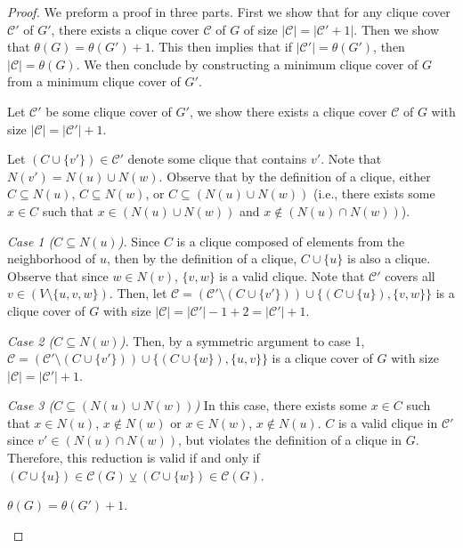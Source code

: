 \documentclass[../techreport.tex]{subfiles}
\begin{document}
\begin{proof}
	We preform a proof in three parts. First we show that for any clique cover $\mathcal{C'}$ of $G'$, there exists a clique cover $\mathcal{C}$ of $G$ of size $|\mathcal{C}| = |\mathcal{C'} + 1|$. Then we show that $\theta(G) = \theta(G') + 1$. This then implies that if $|\mathcal{C'}| = \theta(G')$, then $|\mathcal{C}| = \theta(G)$. We then conclude by constructing a minimum clique cover of $G$ from a minimum clique cover of $G'$.

	\begin{claim}
		Let $\mathcal{C'}$ be some clique cover of $G'$, we show there exists a clique cover $\mathcal{C}$ of $G$ with size $|\mathcal{C}| = |\mathcal{C'}| + 1$.
	\end{claim}

	Let $(C \cup \{v'\}) \in \mathcal{C'}$ denote some clique that contains $v'$. Note that $N(v') = N(u) \cup N(w)$. Observe that by the definition of a clique, either $C \subseteq N(u)$, $C \subseteq N(w)$, or $C \subseteq (N(u) \cup N(w))$ (i.e., there exists some $x \in C$ such that $x \in (N(u) \cup N(w))$ and $x \notin (N(u) \cap N(w))$).

	\noindent\emph{Case 1 ($C \subseteq N(u)$).} Since $C$ is a clique composed of elements from the neighborhood of $u$, then by the definition of a clique, $C \cup \{u\}$ is also a clique. Observe that since $w \in N(v)$, $\{v, w\}$ is a valid clique. Note that $\mathcal{C'}$ covers all $v \in (V \setminus \{u, v, w\})$. Then, let $\mathcal{C} = (\mathcal{C'} \setminus {(C \cup \{v'\})}) \cup \{(C \cup \{u\}), \{v, w\}\}$ is a clique cover of $G$ with size $|\mathcal{C}| = |\mathcal{C'}| - 1 + 2 = |\mathcal{C'}| + 1$.

	\noindent\emph{Case 2 ($C \subseteq N(w)$).} Then, by a symmetric argument to case 1, $\mathcal{C} = (\mathcal{C'} \setminus {(C \cup \{v'\})}) \cup \{(C \cup \{w\}), \{u, v\}\}$ is a clique cover of $G$ with size $|\mathcal{C}| = |\mathcal{C'}| + 1$.


	\noindent\emph{Case 3 ($C \subseteq (N(u) \cup N(w))$)} In this case, there exists some $x \in C$ such that $x \in N(u)$, $x \notin N(w)$ or $x \in N(w)$, $x \notin N(u)$. $C$ is a valid clique in $\mathcal{C'}$ since $v' \in (N(u) \cap N(w))$, but violates the definition of a clique in $G$. Therefore, this reduction is valid if and only if $(C \cup \{u\}) \in \mathcal{C}(G) \veebar (C \cup \{w\}) \in \mathcal{C}(G)$.

	\begin{claim}
		$\theta(G) = \theta(G') + 1$.
	\end{claim}


\end{proof}
\end{document}
